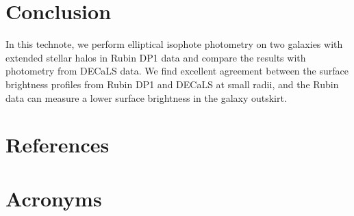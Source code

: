 \documentclass[SE,lsstdraft,authoryear,toc]{lsstdoc}
\begin{document}
\section{Conclusion}
In this technote, we perform elliptical isophote photometry on two galaxies with extended stellar halos in Rubin DP1 data and compare the results with photometry from DECaLS data. We find excellent agreement between the surface brightness profiles from Rubin DP1 and DECaLS at small radii, and the Rubin data can measure a lower surface brightness in the galaxy outskirt. 


\appendix
\section{References} \label{sec:bib}
\renewcommand{\refname}{} %


\section{Acronyms} \label{sec:acronyms}

\end{document}
